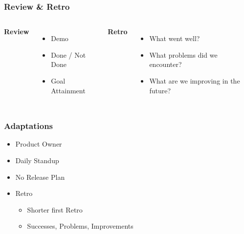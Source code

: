 \begin{frame}
    \frametitle{Review \& Retro}
    \begin{columns}
        \large
        \textbf{Review}
        \begin{itemize}
            \large
            \item Demo
            \item Done / Not Done
            \item Goal Attainment
        \end{itemize}
        \large
        \textbf{Retro}
        \begin{itemize}
            \large
            \item What went well?
            \item What problems did we encounter?
            \item What are we improving in the future?
        \end{itemize}
    \end{columns}
\end{frame}

\begin{frame}
    \frametitle{Adaptations}
    \begin{itemize}
        \large
        \item Product Owner
        \item Daily Standup
        \item No Release Plan
        \item Retro
              \begin{itemize}
                  \large
                  \item Shorter first Retro
                  \item Successes, Problems, Improvements
              \end{itemize}
    \end{itemize}
\end{frame}
